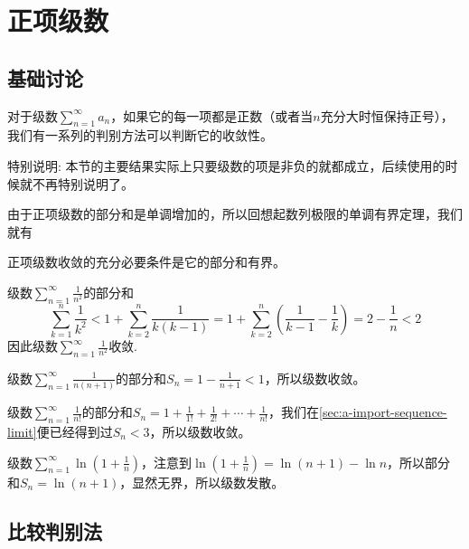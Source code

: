 
\section{正项级数}
\label{sec:positive-number-series}



\subsection{基础讨论}
\label{sec:base-of-positive-series}



对于级数$\sum_{n=1}^{\infty}a_n$，如果它的每一项都是正数（或者当$n$充分大时恒保持正号），我们有一系列的判别方法可以判断它的收敛性。

特别说明: 本节的主要结果实际上只要级数的项是非负的就都成立，后续使用的时候就不再特别说明了。

由于正项级数的部分和是单调增加的，所以回想起数列极限的单调有界定理，我们就有

\begin{theorem}
  正项级数收敛的充分必要条件是它的部分和有界。
\end{theorem}

\begin{example}
  级数$\sum_{n=1}^{\infty}\frac{1}{n^2}$的部分和
  \[ \sum_{k=1}^n \frac{1}{k^2} < 1+\sum_{k=2}^n \frac{1}{k(k-1)} = 1+\sum_{k=2}^n \left( \frac{1}{k-1}-\frac{1}{k} \right) = 2-\frac{1}{n}<2 \]
    因此级数$\sum_{n=1}^{\infty}\frac{1}{n^2}$收敛.
\end{example}

\begin{example}
  级数$\sum_{n=1}^{\infty}\frac{1}{n(n+1)}$的部分和$S_n=1-\frac{1}{n+1}<1$，所以级数收敛。
\end{example}

\begin{example}
  级数$\sum_{n=1}^{\infty}\frac{1}{n!}$的部分和$S_n=1+\frac{1}{1!}+\frac{1}{2!}+\cdots+\frac{1}{n!}$，我们在\autoref{sec:a-import-sequence-limit}便已经得到过$S_n<3$，所以级数收敛。
\end{example}

\begin{example}
  \label{example:series-ln-1-plus-1-over-n-converage}
  级数$\sum_{n=1}^{\infty}\ln{\left( 1+\frac{1}{n} \right)}$，注意到$\ln{\left( 1+\frac{1}{n} \right)} = \ln{(n+1)}-\ln{n}$，所以部分和$S_n=\ln{(n+1)}$，显然无界，所以级数发散。
\end{example}


\subsection{比较判别法}
\label{sec:compare-method-aboud-series-converage}


